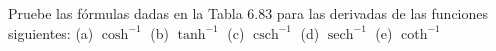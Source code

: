 \item Pruebe las fórmulas dadas en la Tabla 6.83 para las derivadas de las funciones siguientes:
    (a) $\cosh^{-1}$ \quad (b) $\tanh^{-1}$ \quad (c) $\operatorname{csch}^{-1}$ \quad (d) $\operatorname{sech}^{-1}$ \quad (e) $\coth^{-1}$
